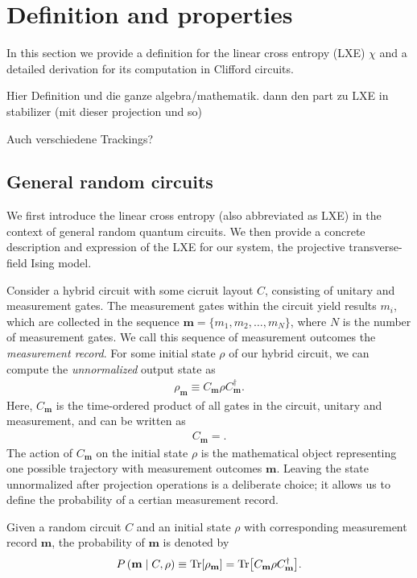 \section{Definition and properties}\label{sec:lxe-defn}
In this section we provide a definition for the linear cross entropy (LXE)
$\chi$ and a detailed derivation for its computation in Clifford circuits.

Hier Definition und die ganze algebra/mathematik. dann den part zu LXE in
stabilizer (mit dieser projection und so)

Auch verschiedene Trackings?

\subsection{General random circuits}
We first introduce the linear cross entropy (also abbreviated as LXE) in the
context of general random quantum circuits. We then provide a concrete
description and expression of the LXE for our system, the projective
transverse-field Ising model.

Consider a hybrid circuit with some cicruit layout $C$, consisting of unitary
and measurement gates. The measurement gates within the circuit yield results
$m_i$, which are collected in the sequence $\mathbf{m} = \{m_1, m_2, \ldots,
m_N\}$, where $N$ is the number of measurement gates. We call this sequence of
measurement outcomes the \emph{measurement record}. For some initial state
$\rho$ of our hybrid circuit, we can compute the \emph{unnormalized} output
state as
\begin{align}\label{eq:rho-m}
  \rho_\mathbf{m} \equiv C_\mathbf{m} \rho C^\dagger_\mathbf{m}
.\end{align}
Here, $C_\mathbf{m}$ is the time-ordered product of all gates in the circuit,
unitary and measurement, and can be written as
\begin{align}
  C_\mathbf{m} = 
.\end{align}
The action of $C_\mathbf{m}$ on the initial state
$\rho$ is the mathematical object representing one possible trajectory with
measurement outcomes $\mathbf{m}$. Leaving the state unnormalized after 
projection operations is a deliberate choice; it allows us to define the
probability of a certian measurement record.

\begin{defn}\label{defn:prob-traj}
  Given a random circuit $C$ and an initial state $\rho$ with corresponding
  measurement record $\mathbf{m}$, the probability of $\mathbf{m}$ is denoted
  by
  \begin{align}
    P\left( \mathbf{m} \mid C, \rho \right) \equiv \Tr[\rho_\mathbf{m}] =
    \Tr[C_\mathbf{m} \rho C^\dagger_\mathbf{m}]
  .\end{align}
\end{defn}

